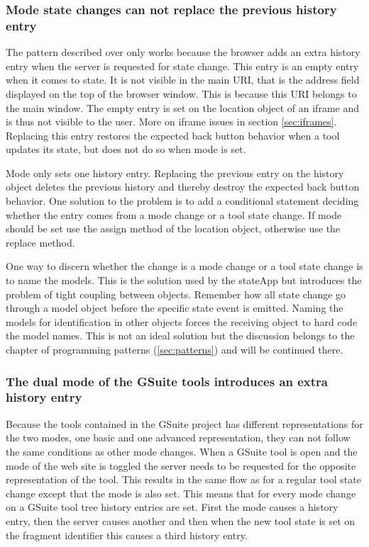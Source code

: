 \documentclass[english]{ifimaster}
\begin{document}
\subsubsection{Mode state changes can not replace the previous history entry}
The pattern described over only works because the browser adds an extra history entry when the server is requested for state change. This entry is an empty entry when it comes to state. It is not visible in the main URI, that is the address field displayed on the top of the browser window. This is because this URI belongs to the main window. The empty entry is set on the location object of an iframe and is thus not visible to the user. More on iframe issues in section \ref{sec:iframes}. Replacing this entry restores the expected back button behavior when a tool updates its state, but does not do so when mode is set. 

Mode only sets one history entry. Replacing the previous entry on the history object deletes the previous history and thereby destroy the expected back button behavior. One solution to the problem is to add a conditional statement deciding whether the entry comes from a mode change or a tool state change. If mode should be set use the assign method of the location object, otherwise use the replace method. 

One way to discern whether the change is a mode change or a tool state change is to name the models. This is the solution used by the stateApp but introduces the problem of tight coupling between objects. Remember how all state change go through a model object before the specific state event is emitted. Naming the models for identification in other objects forces the receiving object to hard code the model names. This is not an ideal solution but the discussion belongs to the chapter of programming patterns (\ref{sec:patterns}) and will be continued there. 

\subsubsection{The dual mode of the GSuite tools introduces an extra history entry}
Because the tools contained in the GSuite project has different representations for the two modes, one basic and one advanced representation, they can not follow the same conditions as other mode changes. When a GSuite tool is open and the mode of the web site is toggled the server needs to be requested for the opposite representation of the tool. This results in the same flow as for a regular tool state change except that the mode is also set. This means that for every mode change on a GSuite tool tree history entries are set. First the mode causes a history entry, then the server causes another and then when the new tool state is set on the fragment identifier this causes a third history entry. 
\end{document}
